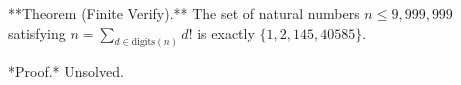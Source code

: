 
**Theorem (Finite Verify).** The set of natural numbers $n \leq 9{,}999{,}999$ satisfying $n = \sum_{d \in \text{digits}(n)} d!$ is exactly $\{1, 2, 145, 40585\}$.

*Proof.* Unsolved.